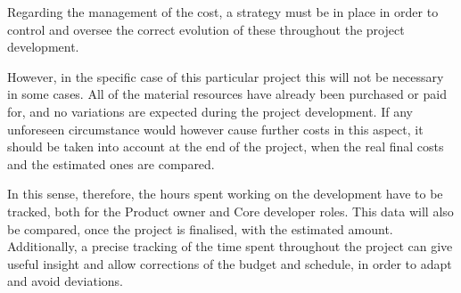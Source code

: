 Regarding the management of the cost, a strategy must be in place in order to control and oversee the correct evolution of these throughout the project development.

However, in the specific case of this particular project this will not be necessary in some cases. All of the material resources have already been purchased or paid for, and no variations are expected during the project development. If any unforeseen circumstance would however cause further costs in this aspect, it should be taken into account at the end of the project, when the real final costs and the estimated ones are compared.

In this sense, therefore, the hours spent working on the development have to be tracked, both for the Product owner and Core developer roles. This data will also be compared, once the project is finalised, with the estimated amount. Additionally, a precise tracking of the time spent throughout the project can give useful insight and allow corrections of the budget and schedule, in order to adapt and avoid deviations.